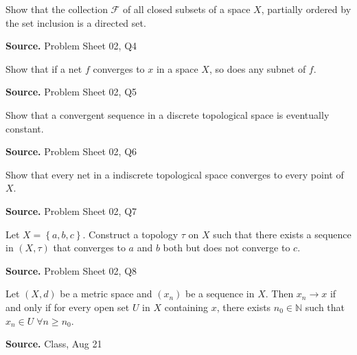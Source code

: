 \documentclass[12pt,twoside]{report}
\newenvironment*{source}{\hfill\scriptsize\textbf{Source.}\space}{\par}
\begin{document}
\begin{samepage}
\begin{ex}
Show that the collection $\mathcal{F}$ of all closed subsets of a space $X$, partially ordered by the set inclusion is a directed set.
\end{ex}
\begin{source}
Problem Sheet 02, Q4
\end{source}
\end{samepage}

\begin{samepage}
\begin{ex}
Show that if a net $f$ converges to $x$ in a space $X$, so does any subnet of $f$.
\end{ex}
\begin{source}
Problem Sheet 02, Q5
\end{source}
\end{samepage}

\begin{samepage}
\begin{ex}
Show that a convergent sequence in a discrete topological space is eventually constant.
\end{ex}
\begin{source}
Problem Sheet 02, Q6
\end{source}
\end{samepage}

\begin{samepage}
\begin{ex}
Show that every net in a indiscrete topological space converges to every point of $X$.
\end{ex}
\begin{source}
Problem Sheet 02, Q7
\end{source}
\end{samepage}

\begin{samepage}
\begin{ex}
Let $X = \left\{ a, b, c \right\}$. Construct a topology $\tau$ on $X$ such that there exists a sequence in $\left (X, \tau\right )$ that converges to $a$ and $b$ both but does not converge to $c$.
\end{ex}
\begin{source}
Problem Sheet 02, Q8
\end{source}
\end{samepage}

\begin{samepage}
\begin{ex}
Let $\left (X, d\right )$ be a metric space and $\left (x_n\right )$ be a sequence in $X$. Then $x_n \to x$ if and only if for every open set $U$ in $X$ containing $x$, there exists $n_0 \in \mathbb{N}$ such that $x_n \in U \;\forall n \geq n_0$.
\end{ex}
\begin{source}
Class, Aug 21
\end{source}
\end{samepage}
\end{document}
